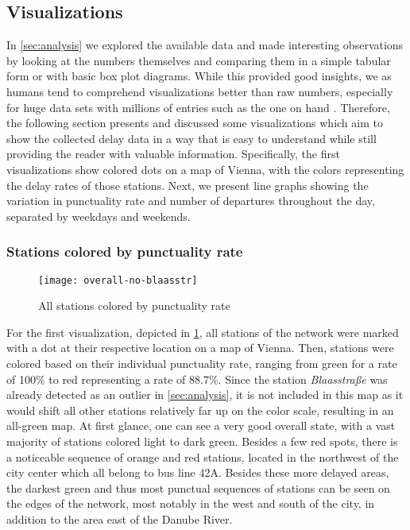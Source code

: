 \subsection{Visualizations}
\label{sec:visualization}

In \cref{sec:analysis} we explored the available data and made interesting observations by looking at the numbers themselves and comparing them in a simple tabular form or with basic box plot diagrams. While this provided good insights, we as humans tend to comprehend visualizations better than raw numbers, especially for huge data sets with millions of entries such as the one on hand \autocite[2]{ware-2019}. Therefore, the following section presents and discussed some visualizations which aim to show the collected delay data in a way that is easy to understand while still providing the reader with valuable information. Specifically, the first visualizations show colored dots on a map of Vienna, with the colors representing the delay rates of those stations. Next, we present line graphs showing the variation in punctuality rate and number of departures throughout the day, separated by weekdays and weekends.

\subsubsection{Stations colored by punctuality rate}

\begin{figure}[h]
	\centering
	\texttt{[image: overall-no-blaasstr]}
	\caption{All stations colored by punctuality rate}
	\label{fig:overall-stations}
\end{figure}

For the first visualization, depicted in \cref{fig:overall-stations}, all stations of the network were marked with a dot at their respective location on a map of Vienna. Then, stations were colored based on their individual punctuality rate, ranging from green for a rate of 100\% to red representing a rate of 88.7\%. Since the station \textit{Blaasstraße} was already detected as an outlier in \cref{sec:analysis}, it is not included in this map as it would shift all other stations relatively far up on the color scale, resulting in an all-green map. At first glance, one can see a very good overall state, with a vast majority of stations colored light to dark green. Besides a few red spots, there is a noticeable sequence of orange and red stations, located in the northwest of the city center which all belong to bus line 42A. Besides these more delayed areas, the darkest green and thus most punctual sequences of stations can be seen on the edges of the network, most notably in the west and south of the city, in addition to the area east of the Danube River.

